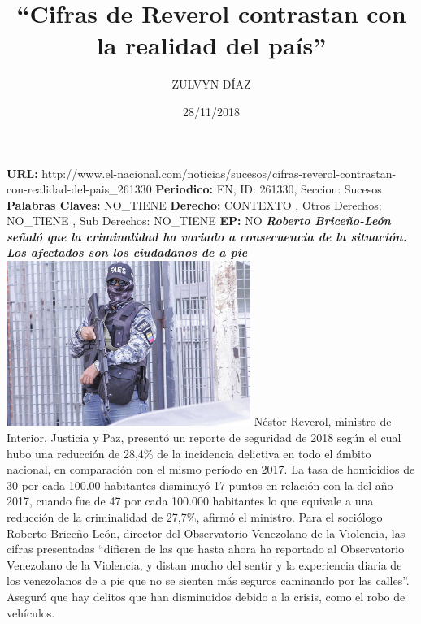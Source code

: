 \documentclass{article}%
\title{\textbf{“Cifras de Reverol contrastan con la realidad del país”}}%
\author{ZULVYN DÍAZ}%
\date{28/11/2018}%
\begin{document}
%
\normalsize%
\maketitle%
\textbf{URL: }%
http://www.el{-}nacional.com/noticias/sucesos/cifras{-}reverol{-}contrastan{-}con{-}realidad{-}del{-}pais\_261330\newline%
%
\textbf{Periodico: }%
EN, %
ID: %
261330, %
Seccion: %
Sucesos\newline%
%
\textbf{Palabras Claves: }%
NO\_TIENE\newline%
%
\textbf{Derecho: }%
CONTEXTO%
, Otros Derechos: %
NO\_TIENE%
, Sub Derechos: %
NO\_TIENE%
\newline%
%
\textbf{EP: }%
NO\newline%
\newline%
%
\textbf{\textit{Roberto Briceño{-}León señaló que la criminalidad ha variado a consecuencia de la situación. Los afectados son los ciudadanos de a pie}}%
\newline%
\newline%
%
\includegraphics[width=300px]{242.jpg}%
\newline%
%
Néstor Reverol, ministro de Interior, Justicia y Paz, presentó un reporte de seguridad de 2018 según el cual hubo una reducción de 28,4\% de la incidencia delictiva en todo el ámbito nacional, en comparación con el mismo período en 2017.%
\newline%
%
La tasa de homicidios de 30 por cada 100.00 habitantes disminuyó 17 puntos en relación con la del año 2017, cuando fue de 47 por cada 100.000 habitantes lo que equivale a una reducción de la criminalidad de 27,7\%, afirmó el ministro.%
\newline%
%
Para el sociólogo Roberto Briceño{-}León, director del Observatorio Venezolano de la Violencia, las cifras presentadas “difieren de las que hasta ahora ha reportado al Observatorio Venezolano de la Violencia, y distan mucho del sentir y la experiencia diaria de los venezolanos de a pie que no se sienten más seguros caminando por las calles”. Aseguró que hay delitos que han disminuidos debido a la crisis, como el robo de vehículos.%
\end{document}
